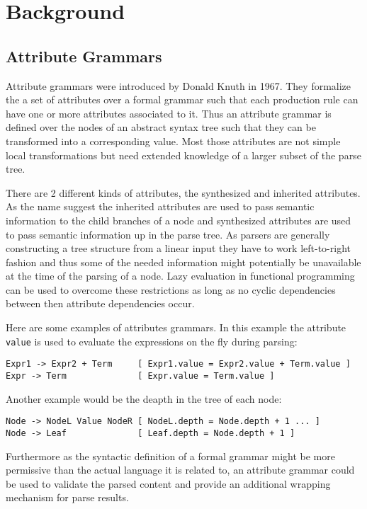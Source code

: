\section{Background}
\subsection{Attribute Grammars}
Attribute grammars were introduced by Donald Knuth in 1967. They formalize the a set of attributes over a formal grammar such that each production rule can have one or more attributes associated to it. Thus an attribute grammar is defined over the nodes of an abstract syntax tree such that they can be transformed into a corresponding value. Most those attributes are not simple local transformations but need extended knowledge of a larger subset of the parse tree.

There are 2 different kinds of attributes, the synthesized and inherited attributes. As the name suggest the inherited attributes are used to pass semantic information to the child branches of a node and synthesized attributes are used to pass semantic information up in the parse tree. As parsers are generally constructing a tree structure from a linear input they have to work left-to-right fashion and thus some of the needed information might potentially be unavailable at the time of the parsing of a node. Lazy evaluation in functional programming can be used to overcome these restrictions as long as no cyclic dependencies between then attribute dependencies occur.

Here are some examples of attributes grammars.
In this example the attribute \verb/value/ is used to evaluate the expressions on the fly during parsing:
\begin{verbatim}
Expr1 -> Expr2 + Term     [ Expr1.value = Expr2.value + Term.value ]
Expr -> Term              [ Expr.value = Term.value ]
\end{verbatim}
Another example would be the deapth in the tree of each node:
\begin{verbatim}
Node -> NodeL Value NodeR [ NodeL.depth = Node.depth + 1 ... ] 
Node -> Leaf              [ Leaf.depth = Node.depth + 1 ]
\end{verbatim}

Furthermore as the syntactic definition of a formal grammar might be more permissive than the actual language it is related to, an attribute grammar could be used to validate the parsed content and provide an additional wrapping mechanism for parse results. 

